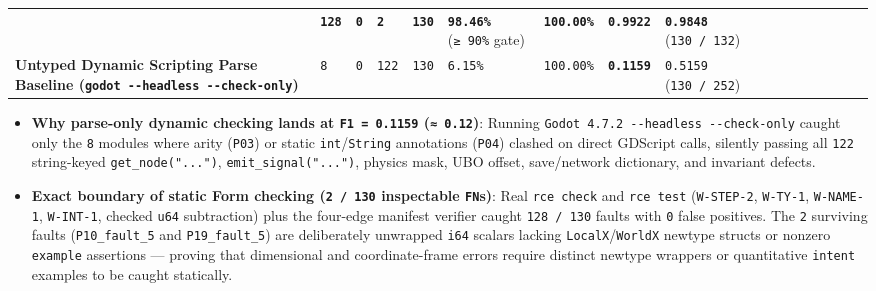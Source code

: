 \documentclass[10pt,letterpaper]{article}
\providecommand{\tightlist}{\setlength{\itemsep}{1pt}\setlength{\parskip}{0pt}}
\begin{document}
{\begin{longtable}[]
{Manifest Verifier} & \textbf{\texttt{128}} & \textbf{\texttt{0}} &
\textbf{\texttt{2}} & \textbf{\texttt{130}} & \textbf{\texttt{98.46\%}}
(\texttt{≥\ 90\%} gate) & \textbf{\texttt{100.00\%}} &
\textbf{\texttt{0.9922}} & \textbf{\texttt{0.9848}}
(\texttt{130\ /\allowbreak{}\ 132}) \\
\textbf{Untyped Dynamic Scripting Parse Baseline
(\texttt{godot\ -\allowbreak{}\/\allowbreak{}-\allowbreak{}headless\ -\allowbreak{}\/\allowbreak{}-\allowbreak{}check-\allowbreak{}only})} & \texttt{8} &
\texttt{0} & \texttt{122} & \texttt{130} & \texttt{6.15\%} &
\texttt{100.00\%} & \textbf{\texttt{0.1159}} & \texttt{0.5159}
(\texttt{130\ /\allowbreak{}\ 252}) \\
\end{longtable}
}

\begin{itemize}
\tightlist
\item
  \textbf{Why parse-only dynamic checking lands at
  \texttt{F1\ =\ 0.\allowbreak{}1159} (\texttt{≈\ 0.12})}: Running
  \texttt{Godot\ 4.\allowbreak{}7.\allowbreak{}2\ -\allowbreak{}\/\allowbreak{}-\allowbreak{}headless\ -\allowbreak{}\/\allowbreak{}-\allowbreak{}check-\allowbreak{}only} caught only the
  \texttt{8} modules where arity (\texttt{P03}) or static
  \texttt{int}/\allowbreak{}\texttt{String} annotations (\texttt{P04}) clashed on
  direct GDScript calls, silently passing all \texttt{122} string-keyed
  \texttt{get\_\allowbreak{}node(\allowbreak{}".\allowbreak{}.\allowbreak{}.\allowbreak{}")}, \texttt{emit\_\allowbreak{}signal(\allowbreak{}".\allowbreak{}.\allowbreak{}.\allowbreak{}")}, physics mask,
  UBO offset, save/network dictionary, and invariant defects.
\item
  \textbf{Exact boundary of static Form checking (\texttt{2\ /\ 130}
  inspectable \texttt{FN}s)}: Real \texttt{rce\ check} and
  \texttt{rce\ test} (\texttt{W-STEP-2}, \texttt{W-TY-1},
  \texttt{W-NAME-1}, \texttt{W-INT-1}, checked \texttt{u64} subtraction)
  plus the four-edge manifest verifier caught \texttt{128\ /\allowbreak{}\ 130}
  faults with \texttt{0} false positives. The \texttt{2} surviving
  faults (\texttt{P10\_\allowbreak{}fault\_\allowbreak{}5} and \texttt{P19\_\allowbreak{}fault\_\allowbreak{}5}) are
  deliberately unwrapped \texttt{i64} scalars lacking
  \texttt{LocalX}/\allowbreak{}\texttt{WorldX} newtype structs or nonzero
  \texttt{example} assertions --- proving that dimensional and
  coordinate-frame errors require distinct newtype wrappers or
  quantitative \texttt{intent} examples to be caught statically.
\end{itemize}
\end{document}
